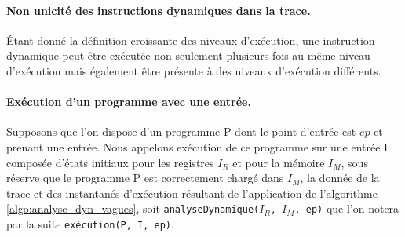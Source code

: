 
\paragraph{Non unicité des instructions dynamiques dans la trace.}
 Étant donné la définition croissante des niveaux d'exécution, une instruction dynamique peut-être exécutée non seulement plusieurs fois au même niveau d'exécution mais également être présente à des niveaux d'exécution différents.

\paragraph{Exécution d'un programme avec une entrée.}
Supposons que l'on dispose d'un programme P dont le point d'entrée est $ep$ et prenant une entrée.
Nous appelons exécution de ce programme sur une entrée I composée d'états initiaux pour les registres $I_R$ et pour la mémoire $I_M$, sous réserve que le programme P est correctement chargé dans $I_M$, la donnée de la trace et des instantanés d'exécution résultant de l'application de l'algorithme \ref{algo:analyse_dyn_vagues}, soit \texttt{analyseDynamique($I_R$, $I_M$, ep)} que l'on notera par la suite \texttt{exécution(P, I, ep)}.

